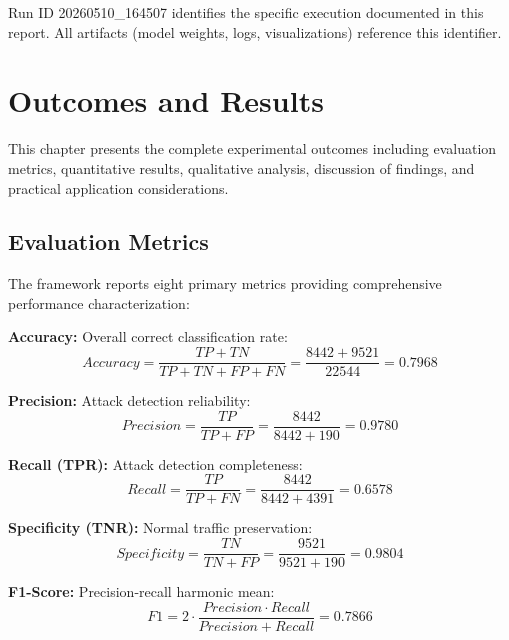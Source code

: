 \documentclass[12pt,a4paper]{report}
\begin{document}
Run ID 20260510\_164507 identifies the specific execution documented in this report. All artifacts (model weights, logs, visualizations) reference this identifier.

\chapter{Outcomes and Results}

This chapter presents the complete experimental outcomes including evaluation metrics, quantitative results, qualitative analysis, discussion of findings, and practical application considerations.

\section{Evaluation Metrics}

The framework reports eight primary metrics providing comprehensive performance characterization:

\textbf{Accuracy:} Overall correct classification rate:
\begin{equation}
    Accuracy = \frac{TP + TN}{TP + TN + FP + FN} = \frac{8442 + 9521}{22544} = 0.7968
\end{equation}

\textbf{Precision:} Attack detection reliability:
\begin{equation}
    Precision = \frac{TP}{TP + FP} = \frac{8442}{8442 + 190} = 0.9780
\end{equation}

\textbf{Recall (TPR):} Attack detection completeness:
\begin{equation}
    Recall = \frac{TP}{TP + FN} = \frac{8442}{8442 + 4391} = 0.6578
\end{equation}

\textbf{Specificity (TNR):} Normal traffic preservation:
\begin{equation}
    Specificity = \frac{TN}{TN + FP} = \frac{9521}{9521 + 190} = 0.9804
\end{equation}

\textbf{F1-Score:} Precision-recall harmonic mean:
\begin{equation}
    F1 = 2 \cdot \frac{Precision \cdot Recall}{Precision + Recall} = 0.7866
\end{equation}
\end{document}
